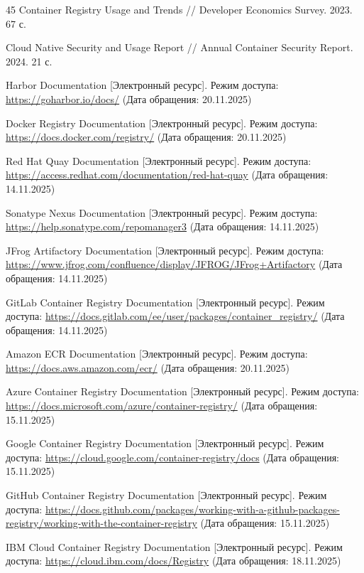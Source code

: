 \begin{thebibliography}{45}
	 Container Registry Usage and Trends // Developer Economics Survey. 2023. 67 с.
	
	 Cloud Native Security and Usage Report // Annual Container Security Report. 2024. 21 с.
	
	 Harbor Documentation [Электронный ресурс]. Режим доступа: \url{https://goharbor.io/docs/} (Дата обращения: 20.11.2025)
	
	 Docker Registry Documentation [Электронный ресурс]. Режим доступа: \url{https://docs.docker.com/registry/} (Дата обращения: 20.11.2025)
	
	 Red Hat Quay Documentation [Электронный ресурс]. Режим доступа: \url{https://access.redhat.com/documentation/red-hat-quay} (Дата обращения: 14.11.2025)
	
	 Sonatype Nexus Documentation [Электронный ресурс]. Режим доступа: \url{https://help.sonatype.com/repomanager3} (Дата обращения: 14.11.2025)
	
	 JFrog Artifactory Documentation [Электронный ресурс]. Режим доступа: \url{https://www.jfrog.com/confluence/display/JFROG/JFrog+Artifactory} (Дата обращения: 14.11.2025)
	
	 GitLab Container Registry Documentation [Электронный ресурс]. Режим доступа: \url{https://docs.gitlab.com/ee/user/packages/container_registry/} (Дата обращения: 14.11.2025)
	
	 Amazon ECR Documentation [Электронный ресурс]. Режим доступа: \url{https://docs.aws.amazon.com/ecr/} (Дата обращения: 20.11.2025)
	
	 Azure Container Registry Documentation [Электронный ресурс]. Режим доступа: \url{https://docs.microsoft.com/azure/container-registry/} (Дата обращения: 15.11.2025)
	
	 Google Container Registry Documentation [Электронный ресурс]. Режим доступа: \url{https://cloud.google.com/container-registry/docs} (Дата обращения: 15.11.2025)
	
	 GitHub Container Registry Documentation [Электронный ресурс]. Режим доступа: \url{https://docs.github.com/packages/working-with-a-github-packages-registry/working-with-the-container-registry} (Дата обращения: 15.11.2025)
	
	 IBM Cloud Container Registry Documentation [Электронный ресурс]. Режим доступа: \url{https://cloud.ibm.com/docs/Registry} (Дата обращения: 18.11.2025)
	

\end{thebibliography}
